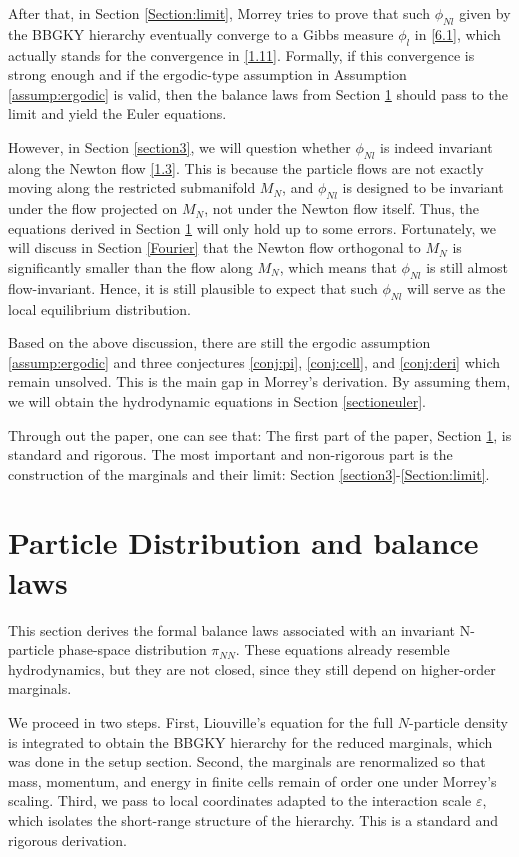 \documentclass[11pt]{article}
\begin{document}
After that, in Section \ref{Section:limit}, Morrey tries to prove that such $\phi_{Nl}$ given by the BBGKY hierarchy eventually converge to a Gibbs measure $\phi_l$ in \eqref{6.1}, which actually stands for the convergence in \eqref{1.11}. Formally, if this convergence is strong enough and if the ergodic-type assumption in Assumption \ref{assump:ergodic} is valid, then the balance laws from Section \ref{section2} should pass to the limit and yield the Euler equations.

However, in Section \ref{section3}, we will question whether $\phi_{Nl}$ is indeed invariant along the Newton flow \eqref{1.3}. This is because the particle flows are not exactly moving along the restricted submanifold $M_N$, and $\phi_{Nl}$ is designed to be invariant under the flow projected on $M_N$, not under the Newton flow itself. Thus, the equations derived in Section \ref{section2} will only hold up to some errors. Fortunately, we will discuss in Section \ref{Fourier} that the Newton flow orthogonal to $M_N$ is significantly smaller than the flow along $M_N$, which means that $\phi_{Nl}$ is still almost flow-invariant. Hence, it is still plausible to expect that such $\phi_{Nl}$ will serve as the local equilibrium distribution.

Based on the above discussion, there are still the ergodic assumption \ref{assump:ergodic} and three conjectures \ref{conj:pi}, \ref{conj:cell}, and \ref{conj:deri} which remain unsolved. This is the main gap in Morrey's derivation. By assuming them, we will obtain the hydrodynamic equations in Section \ref{sectioneuler}. 

Through out the paper, one can see that:  The first part of the paper, Section \ref{section2}, is standard and rigorous. The most important and non-rigorous part is the construction of the marginals and their limit: Section \ref{section3}-\ref{Section:limit}.

\section{Particle Distribution  and balance laws}\label{section2}
This section derives the formal balance laws associated with an invariant N-particle phase-space distribution $\pi_{NN}$. These equations already resemble hydrodynamics, but they are not closed, since they still depend on higher-order marginals.

We proceed in two steps. First, Liouville's equation for the full $N$-particle density is integrated to obtain the BBGKY hierarchy for the reduced marginals, which was done in the setup section. Second, the marginals are renormalized so that mass, momentum, and energy in finite cells remain of order one under Morrey's scaling. Third, we pass to local coordinates adapted to the interaction scale $\varepsilon$, which isolates the short-range structure of the hierarchy. This is a standard and rigorous derivation.
\end{document}
